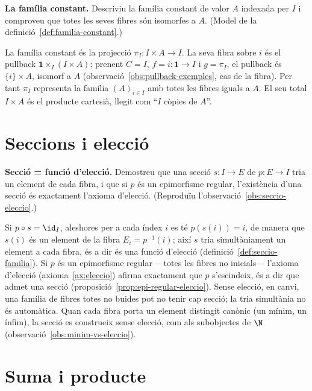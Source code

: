 \begin{exercici}
\textbf{La família constant.} Descriviu la família constant de valor \(A\) indexada per \(I\) i comproveu que totes les seves fibres són isomorfes a \(A\). (Model de la definició~\ref{def:familia-constant}.)
\end{exercici}
\begin{solucio}
La família constant és la projecció \(\pi_I\colon I\times A\to I\). La seva fibra sobre \(i\) és el pullback \(\mathbf1\times_I(I\times A)\); prenent \(C=I\), \(f=i\colon\mathbf1\to I\) i \(g=\pi_I\), el pullback és \(\{i\}\times A\), isomorf a \(A\) (observació~\ref{obs:pullback-exemples}, cas de la fibra). Per tant \(\pi_I\) representa la família \((A)_{i\in I}\) amb totes les fibres iguals a \(A\). El seu total \(I\times A\) és el producte cartesià, llegit com \enquote{\(I\) còpies de \(A\)}.
\end{solucio}

\section{Seccions i elecció}\label{prac:seccions}

\begin{exercici}
\textbf{Secció = funció d'elecció.} Demostreu que una secció \(s\colon I\to E\) de \(p\colon E\to I\) tria un element de cada fibra, i que si \(p\) és un epimorfisme regular, l'existència d'una secció és exactament l'axioma d'elecció. (Reproduïu l'observació~\ref{obs:seccio-eleccio}.)
\end{exercici}
\begin{solucio}
Si \(p\circ s=\id_I\), aleshores per a cada índex \(i\) es té \(p(s(i))=i\), de manera que \(s(i)\) és un element de la fibra \(E_i=p^{-1}(i)\); així \(s\) tria simultàniament un element a cada fibra, és a dir és una funció d'elecció (definició~\ref{def:seccio-familia}). Si \(p\) és un epimorfisme regular ---totes les fibres no inicials--- l'axioma d'elecció (axioma~\ref{ax:eleccio}) afirma exactament que \(p\) s'escindeix, és a dir que admet una secció (proposició~\ref{prop:epi-regular-eleccio}). Sense elecció, en canvi, una família de fibres totes no buides pot no tenir cap secció; la tria simultània no és automàtica. Quan cada fibra porta un element distingit canònic (un mínim, un ínfim), la secció es construeix sense elecció, com als subobjectes de \(\N\) (observació~\ref{obs:minim-vs-eleccio}).
\end{solucio}

\section{Suma i producte}\label{prac:suma-producte}

